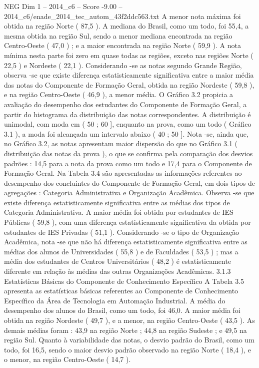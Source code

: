 \begin{textsample}{NEG Dim 1 – 2014\_c6 – Score -9.00 – 2014\_c6/enade\_2014\_tec\_autom\_43f2ddc563.txt}
A menor nota máxima foi obtida na região Norte ( 87,5 ).
A mediana do Brasil, como um todo, foi 55,4, a mesma obtida na região Sul, sendo a menor mediana encontrada na região Centro-Oeste ( 47,0 ) ; e a maior encontrada na região Norte ( 59,9 ).
A nota mínima nesta parte foi zero em quase todas as regiões, exceto nas regiões Norte ( 22,5 ) e Nordeste ( 22,1 ).
Considerando -se as notas segundo Grande Região, observa -se que existe diferença estatisticamente significativa entre a maior média das notas do Componente de Formação Geral, obtida na região Nordeste ( 59,8 ), e na região Centro-Oeste ( 46,9 ), a menor média.
O Gráfico 3.2 propicia a avaliação do desempenho dos estudantes do Componente de Formação Geral, a partir do histograma da distribuição das notas correspondentes.
A distribuição é unimodal, com moda em ( 50 ; 60 ], enquanto na prova, como um todo ( Gráfico 3.1 ), a moda foi alcançada um intervalo abaixo ( 40 ; 50 ].
Nota -se, ainda que, no Gráfico 3.2, as notas apresentam maior dispersão do que no Gráfico 3.1 ( distribuição das notas da prova ), o que se confirma pela comparação dos desvios padrões : 14,5 para a nota da prova como um todo e 17,4 para o Componente de Formação Geral.
Na Tabela 3.4 são apresentadas as informações referentes ao desempenho dos concluintes do Componente de Formação Geral, em dois tipos de agregações : Categoria Administrativa e Organização Acadêmica.
Observa -se que existe diferença estatisticamente significativa entre as médias dos tipos de Categoria Administrativa.
A maior média foi obtida por estudantes de IES Públicas ( 59,8 ), com uma diferença estatisticamente significativa da obtida por estudantes de IES Privadas ( 51,1 ).
Considerando -se o tipo de Organização Acadêmica, nota -se que não há diferença estatisticamente significativa entre as médias dos alunos de Universidades ( 55,8 ) e de Faculdades ( 53,5 ) ; mas a média dos estudantes de Centros Universitários ( 48,2 ) é estatisticamente diferente em relação às médias das outras Organizações Acadêmicas. 3.1.3 Estatísticas Básicas do Componente de Conhecimento Específico A Tabela 3.5 apresenta as estatísticas básicas referentes ao Componente de Conhecimento Específico da Área de Tecnologia em Automação Industrial.
A média do desempenho dos alunos do Brasil, como um todo, foi 46,0.
A maior média foi obtida na região Nordeste ( 49,7 ), e a menor, na região Centro-Oeste ( 43,5 ).
As demais médias foram : 43,9 na região Norte ; 44,8 na região Sudeste ; e 49,5 na região Sul.
Quanto à variabilidade das notas, o desvio padrão do Brasil, como um todo, foi 16,5, sendo o maior desvio padrão observado na região Norte ( 18,4 ), e o menor, na região Centro-Oeste ( 14,7 ).

\end{textsample}
